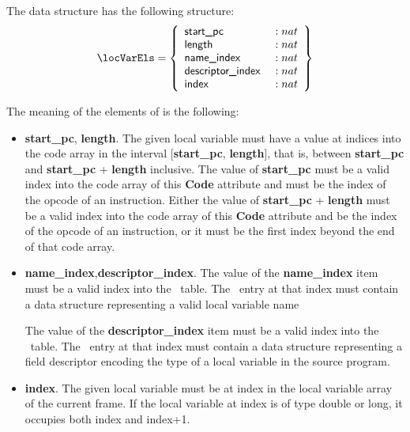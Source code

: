 The data structure \locVarEls has the following structure:
$$\locVarEls  = \left\{\begin{array}{ll} \mbox{\rm\textsf{start\_pc}}   & :   nat \\
                                                \mbox{\rm\textsf{length}}   & :  nat \\
						\mbox{\rm\textsf{name\_index }} & : nat \\
						\mbox{\rm\textsf{descriptor\_index }} & : nat \\
						 \mbox{\rm\textsf{index }} & : nat \\
	                        \end{array} \right\} $$

The meaning of the elements of \locVarEls is the following:
\begin{itemize}

\item \textbf{start\_pc},  \textbf{length}.
    The given local variable must have a value at indices into the code array in the interval [\textbf{start\_pc},  \textbf{length}],
    that is, between \textbf{start\_pc} and  \textbf{start\_pc} + \textbf{length} inclusive. 
    The value of \textbf{start\_pc} must be a valid index into the code array of this \textbf{Code}
    attribute and must be the index of the opcode of an instruction. Either the value of \textbf{start\_pc} + \textbf{length}  must
     be a valid index into the code array of this \textbf{Code} attribute and be the index of the opcode of an instruction,
    or it must be the first index beyond the end of that code array.

\item \textbf{name\_index},\textbf{descriptor\_index}.
    The value of the \textbf{name\_index} item must be a valid index into the \constantPool \ table. 
    The \constantPool \ entry at that index must contain a data structure representing a valid local variable name 

    The value of the \textbf{descriptor\_index} item must be a valid index into the \constantPool \ table. 
    The \constantPool \ entry at that index must contain a data structure representing a field descriptor encoding the type of a local variable in the source program.

\item \textbf{index}.
    The given local variable must be at index in the local variable array of the current frame.
    If the local variable at index is of type double or long, it occupies both index and index+1.

\end{itemize}


